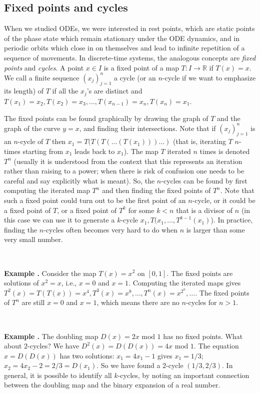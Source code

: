 \documentclass[12pt]{amsart}
\newcounter{example}
\newcommand{\beginexam}{\ \\ \addtocounter{example}{1} \textbf{Example \arabic{example}.} }
\begin{document}
\subsection{Fixed points and cycles}

When we studied ODEs, we were interested in rest points, which are static points of the phase state which remain stationary under the ODE dynamics, and in periodic orbits which close in on themselves and lead to infinite repetition of a sequence of movements. In discrete-time systems, the analogous concepts are \emph{fixed points} and \emph{cycles}. A point $x\in I$ is a fixed point of a map $T:I\to\mathbb{R}$ if $T(x)=x$. We call a finite sequence $(x_j)_{j=1}^n$ a cycle (or an $n$-cycle if we want to emphasize its length) of $T$ if all the $x_j$'s are distinct and $T(x_1)=x_2, T(x_2)=x_3, \ldots, T(x_{n-1})=x_n, T(x_n)=x_1$.

The fixed points can be found graphically by drawing the graph of $T$ and the graph of the curve $y=x$, and finding their intersections. Note that if $(x_j)_{j=1}^n$ is an $n$-cycle of $T$ then $x_1 = T(T(T(\ldots(T(x_1)))\ldots)$ (that is, iterating $T$ $n$-times starting from $x_1$ leads back to $x_1$). The map $T$ iterated $n$ times is denoted $T^n$ (usually it is understood from the context that this represents an iteration rather than raising to a power; when there is risk of confusion one needs to be careful and say explicitly what is meant). So, the $n$-cycles can be found by first computing the iterated map $T^n$ and then finding the fixed points of $T^n$. Note that such a fixed point could turn out to be the first point of an $n$-cycle, or it could be a fixed point of $T$, or a fixed point of $T^k$ for some $k<n$ that is a divisor of $n$ (in this case we can use it to generate a $k$-cycle $x_1,T(x_1,\ldots,T^{k-1}(x_1)$). In practice, finding the $n$-cycles often becomes very hard to do when $n$ is larger than some very small number.

\beginexam Consider the map $T(x)=x^2$ on $[0,1]$. The fixed points are solutions of $x^2=x$, i.e., $x=0$ and $x=1$. Computing the iterated maps gives $T^2(x)=T(T(x))=x^4, T^3(x)=x^8, \ldots, T^n(x)=x^{2^n}, \ldots$. The fixed points of $T^n$ are still $x=0$ and $x=1$, which means there are no $n$-cycles for $n>1$.

\beginexam The doubling map $D(x)=2x\textrm{ mod }1$ has no fixed points. What about $2$-cycles? We have $D^2(x)=D(D(x))=4x\textrm{ mod }1$. The equation $x=D(D(x))$ has two solutions: $x_1=4x_1-1$ gives $x_1=1/3$; $x_2=4x_2-2=2/3 = D(x_1)$. So we have found a $2$-cycle $(1/3,2/3)$. In general, it is possible to identify all $k$-cycles, by noting an important connection between the doubling map and the binary expansion of a real number.
\end{document}
